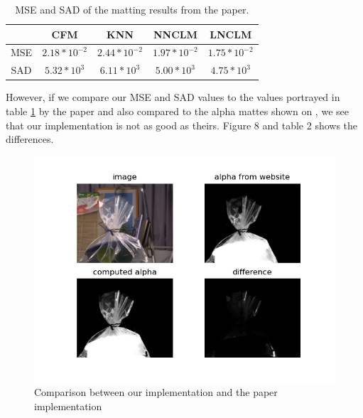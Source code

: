 \begin{table}
	\centering
	\begin{tabular}{ c c c c c }
		\hline
		& CFM & KNN	& NNCLM		& LNCLM \\ 
		\hline
		MSE & $2.18 * 10^{-2}$ & $2.44 * 10^{-2}$	& $1.97 * 10^{-2}$ & $1.75 * 10^{-2}$ \\  
		\hline
		SAD & $5.32 * 10^{3}$ & $6.11 * 10^{3}$	& $5.00 * 10^{3}$ & $4.75 * 10^{3}$ \\  
		\hline
	\end{tabular}
	\caption{MSE and SAD of the matting results from the paper.}\label{table:2}
\end{table}

However, if we compare our MSE and SAD values to the values portrayed in table \ref{table:2} by the paper \cite{lnclm} and also compared to the alpha mattes shown on \cite{benchmark}, we see that our implementation is not as good as theirs. Figure 8 and table 2 shows the differences. 

\begin{figure}[htb]
	\begin{center}
		\includegraphics[width=350pt]{bilder/figure_7}
		\caption{Comparison between our implementation and the paper implementation}\label{fig_7}
	\end{center}
\end{figure}


